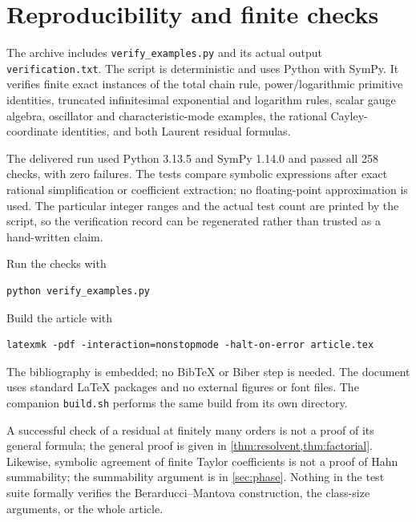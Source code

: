 \documentclass[11pt,letterpaper]{article}
\numberwithin{equation}{section}
\theoremstyle{definition}
\theoremstyle{remark}
\begin{document}
\section{Reproducibility and finite checks}\label{app:checks}

The archive includes \texttt{verify\_examples.py} and its actual output \texttt{verification.txt}. The script is deterministic and uses Python with SymPy. It verifies finite exact instances of the total chain rule, power/logarithmic primitive identities, truncated infinitesimal exponential and logarithm rules, scalar gauge algebra, oscillator and characteristic-mode examples, the rational Cayley-coordinate identities, and both Laurent residual formulas.

The delivered run used Python 3.13.5 and SymPy 1.14.0 and passed all 258 checks, with zero failures. The tests compare symbolic expressions after exact rational simplification or coefficient extraction; no floating-point approximation is used. The particular integer ranges and the actual test count are printed by the script, so the verification record can be regenerated rather than trusted as a hand-written claim.

Run the checks with
\begin{lstlisting}
python verify_examples.py
\end{lstlisting}
Build the article with
\begin{lstlisting}
latexmk -pdf -interaction=nonstopmode -halt-on-error article.tex
\end{lstlisting}
The bibliography is embedded; no BibTeX or Biber step is needed. The document uses standard LaTeX packages and no external figures or font files. The companion \texttt{build.sh} performs the same build from its own directory.

A successful check of a residual at finitely many orders is not a proof of its general formula; the general proof is given in \cref{thm:resolvent,thm:factorial}. Likewise, symbolic agreement of finite Taylor coefficients is not a proof of Hahn summability; the summability argument is in \cref{sec:phase}. Nothing in the test suite formally verifies the Berarducci--Mantova construction, the class-size arguments, or the whole article.
\end{document}
